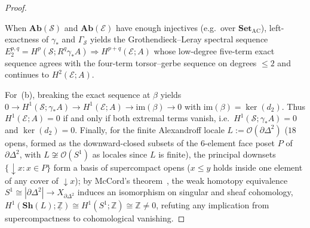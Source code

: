 \documentclass[10pt,twoside,openright]{book}
\theoremstyle{crmplain}
\theoremstyle{crmdef}
\theoremstyle{crmremark}
\begin{document}
\begin{proof}
\begin{itemize}[leftmargin=1.5em]
\end{itemize}
When $\mathbf{Ab}(\mathcal{S})$ and $\mathbf{Ab}(\mathcal{E})$ have enough injectives (e.g.\ over $\mathbf{Set}_{\mathrm{AC}}$), left-exactness of $\gamma_*$ and $\Gamma_{\mathcal{S}}$ yields the Grothendieck--Leray spectral sequence $E_2^{p,q} = H^p(\mathcal{S}; R^q\gamma_* A) \Longrightarrow H^{p+q}(\mathcal{E}; A)$ whose low-degree five-term exact sequence agrees with the four-term torsor--gerbe sequence on degrees $\le 2$ and continues to $H^2(\mathcal{E}; A)$.

For~(b), breaking the exact sequence at $\beta$ yields $0 \to H^1(\mathcal{S}; \gamma_* A) \to H^1(\mathcal{E}; A) \to \mathrm{im}(\beta) \to 0$ with $\mathrm{im}(\beta) = \ker(d_2)$. Thus $H^1(\mathcal{E}; A) = 0$ if and only if both extremal terms vanish, i.e.\ $H^1(\mathcal{S}; \gamma_* A) = 0$ and $\ker(d_2) = 0$. Finally, for the finite Alexandroff locale $L := \mathcal{O}(\partial\Delta^2)$ ($18$ opens, formed as the downward-closed subsets of the $6$-element face poset $P$ of $\partial\Delta^2$, with $L \not\cong \mathcal{O}(S^1)$ as locales since $L$ is finite), the principal downsets $\{\downarrow x : x \in P\}$ form a basis of supercompact opens ($x \le y$ holds inside one element of any cover of $\downarrow x$); by McCord's theorem~\cite[Theorem~1]{McCord66}, the weak homotopy equivalence $S^1 \cong |\partial\Delta^2| \to X_{\partial\Delta^2}$ induces an isomorphism on singular and sheaf cohomology, $H^1(\mathbf{Sh}(L); \underline{\mathbb{Z}}) \cong H^1(S^1; \mathbb{Z}) \cong \mathbb{Z} \neq 0$, refuting any implication from supercompactness to cohomological vanishing.
\end{proof}
\end{document}
